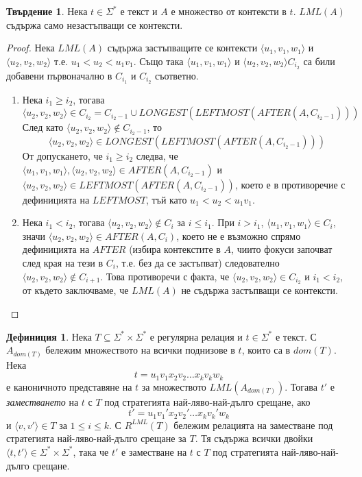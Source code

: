 \documentclass[12pt, oneside]{article}
\theoremstyle{definition}
\newtheorem{definition}{Дефиниция}[section]
\newtheorem{proposition}{Твърдение}[section]
\begin{document}
\begin{proposition}
	Нека \( t \in \Sigma^* \) е текст и \(A\) е множество от контексти в \(t\). \( LML(A) \) съдържа само незастъпващи се контексти.

	\begin{proof}
		Нека \( LML(A) \) съдържа застъпващите се контексти \( \langle u_1, v_1, w_1 \rangle \) и \( \langle u_2, v_2, w_2 \rangle \) т.е. \( u_1 < u_2 < u_1v_1 \). Също така \( \langle u_1, v_1, w_1 \rangle \) и \( \langle u_2, v_2, w_2 \rangle C_{i_2} \) са били добавени първоначално в \( C_{i_1} \text{ и } C_{i_2} \) съответно.
		\begin{enumerate}
			\item Нека \( i_1 \geq i_2 \), тогава
			\[ \langle u_2, v_2, w_2 \rangle \in C_{i_2} = C_{i_2-1} \cup LONGEST(LEFTMOST(AFTER(A, C_{i_2-1}))) \]
			\noindent След като \( \langle u_2, v_2, w_2 \rangle \notin C_{i_2-1} \), то 
			\[ \langle u_2, v_2, w_2 \rangle \in LONGEST(LEFTMOST(AFTER(A, C_{i_2-1}))) \]
			От допускането, че \( i_1 \geq i_2 \) следва, че \( \langle u_1, v_1, w_1 \rangle, \langle u_2, v_2, w_2 \rangle \in AFTER(A,C_{i_2-1}) \) и \( \langle u_2, v_2, w_2 \rangle \in LEFTMOST(AFTER(A,C_{i_2-1})) \), което е в противоречие с дефиницията на \( LEFTMOST \), тъй като \( u_1 < u_2 < u_1v_1 \).

			\item Нека \( i_1 < i_2 \), тогава \( \langle u_2, v_2, w_2 \rangle \notin C_i \) за \( i \leq i_1 \). При \( i > i_1 \), \( \langle u_1, v_1, w_1 \rangle \in C_i \), значи \( \langle u_2, v_2, w_2 \rangle \in AFTER(A, C_i) \), което не е възможно спрямо дефиницията на \( AFTER \) (избира контекстите в \(A\), чиито фокуси започват след края на тези в \(C_i\), т.е. без да се застъпват) следователно \( \langle u_2, v_2, w_2 \rangle \notin C_{i+1} \). Това противоречи с факта, че \( \langle u_2, v_2, w_2 \rangle \in C_{i_2} \) и \(i_1 < i_2 \), от където заключваме, че \( LML(A) \) не съдържа застъпващи се контексти.
		\end{enumerate}
	\end{proof}
\end{proposition}

\begin{definition}
	Нека \( T \subseteq \Sigma^* \times \Sigma^* \) е регулярна релация и \( t \in \Sigma^* \) е текст. С \( A_{dom(T)} \) бележим множеството на всички поднизове в \(t\), които са в \(dom(T)\). Нека \[ t = u_1 v_1 x_2 v_2 \dots x_k v_k w_k \] е каноничното представяне на \(t\) за множеството \( LML(A_{dom(T)}) \). Тогава \(t'\) е \emph{заместването} на \(t\) с \(T\) под стратегията най-ляво-най-дълго срещане, ако 
	\[t' = u_1 v_1' x_2 v_2' \dots x_k v_k' w_k\] 
	и \( \langle v, v' \rangle \in T \) за \( 1 \leq i \leq k \). С \( R^{LML}(T) \) бележим релацията на заместване под стратегията най-ляво-най-дълго срещане за \(T\). Тя съдържа всички двойки \( \langle t, t' \rangle \in \Sigma^* \times \Sigma^* \), така че \( t' \) е заместване на \( t \) с \(T\) под стратегията най-ляво-най-дълго срещане.
\end{definition}
\end{document}

